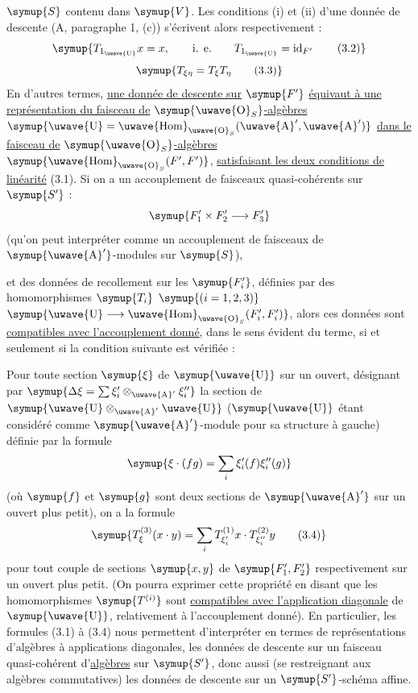 $\symup{S}$ contenu dans $\symup{V}$. Les conditions (i) et (ii) d'une donnée de descente
(A, paragraphe 1, (c)) s'écrivent alors respectivement :
\begin{equation}
  \symup{T_{1_{\text{\uwave{U}}}}x=x,
  \qquad\text{i. e.}\qquad
  T_{1_{\text{\uwave{U}}}}=\operatorname{id}_{F'}
  \tag{3.2}}
\end{equation}
\begin{equation}
  \symup{T_{\xi\eta}=T_\xi T_\eta
  \tag{3.3}}
\end{equation}
En d'autres termes, \uline{une donnée de descente sur} $\symup{F'}$ \uline{équivaut à une représentation du faisceau de} $\symup{\text{\uwave{O}}_S}$\uline{-algèbres} $\symup{\text{\uwave{U}}=\mathop{\text{\uwave{Hom}}}\nolimits_{\text{\uwave{O}}_S}(\text{\uwave{A}}',\text{\uwave{A}}')}$ \uline{dans le faisceau de} $\symup{\text{\uwave{O}}_S}$\uline{-algèbres} $\symup{\mathop{\text{\uwave{Hom}}}\nolimits_{\text{\uwave{O}}_S}(F',F')}$, \uline{satisfaisant les deux conditions de linéarité} (3.1). Si on a un accouplement de faisceaux quasi-cohérents sur
$\symup{S'}$ :
\[
  \symup{F'_1\times F'_2\longrightarrow F'_3}
\]
(qu'on peut interpréter comme un accouplement de faisceaux de
$\symup{\text{\uwave{A}}'}$-modules sur $\symup{S}$),

et des données de recollement sur les $\symup{F'_i}$, définies par des homomorphismes
$\symup{T_i}$ $\symup{(i=1,2,3)}$ $\symup{\text{\uwave{U}}\longrightarrow\mathop{\text{\uwave{Hom}}}\nolimits_{\text{\uwave{O}}_S}(F'_i,F'_i)}$,
alors ces données sont \uline{compatibles avec l'accouplement donné}, dans le sens
évident du terme, si et seulement si la condition suivante est vérifiée :

Pour toute section $\symup{\xi}$ de $\symup{\text{\uwave{U}}}$ sur un ouvert, désignant par
$\symup{\Delta\xi=\sum\xi'_i\otimes_{\text{\uwave{A}}'}\xi''_i}$
la section de $\symup{\text{\uwave{U}}\otimes_{\text{\uwave{A}}'}\text{\uwave{U}}}$ ($\symup{\text{\uwave{U}}}$ étant
considéré comme $\symup{\text{\uwave{A}}'}$-module pour sa structure à gauche) définie par la
formule
\[
  \symup{\xi\mathbin{\cdot}(fg)=\sum_i\xi'_i(f)\xi''_i(g)}
\]
(où $\symup{f}$ et $\symup{g}$ sont deux sections de $\symup{\text{\uwave{A}}'}$ sur un ouvert plus petit),
on a la formule
\begin{equation}
  \symup{T^{(3)}_\xi(x\mathbin{\cdot}y)
  =\sum_iT^{(1)}_{\xi'_i}x\mathbin{\cdot}T^{(2)}_{\xi''_i}y
  \tag{3.4}}
\end{equation}
pour tout couple de sections $\symup{x,y}$ de $\symup{F'_1,F'_2}$ respectivement sur un ouvert
plus petit. (On pourra exprimer cette
propriété en disant que les homomorphismes $\symup{T^{(i)}}$ sont \uline{compatibles avec l'application diagonale} de $\symup{\text{\uwave{U}}}$, relativement à l'accouplement donné).
En particulier, les formules (3.1) à (3.4) nous permettent d'interpréter en
termes de représentations d'algèbres à applications diagonales, les données de
descente sur un faisceau quasi-cohérent d'\uline{algèbres} sur $\symup{S'}$, donc aussi (se
restreignant aux algèbres commutatives) les données de descente sur un
$\symup{S'}$-schéma affine.

